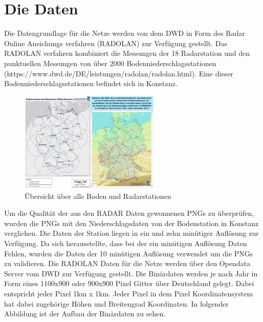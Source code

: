 \section{Die Daten}\label{die daten}
Die Datengrundlage für die Netze werden von dem DWD in Form des Radar Online Aneichungs verfahren (RADOLAN) zur Verfügung gestellt. Das RADOLAN verfahren kombiniert die Messungen der 18 Radarstation und den punktuellen Messungen von über 2000 Bodenniederschlagsstationen (https://www.dwd.de/DE/leistungen/radolan/radolan.html). Eine dieser Bodenniederschlagsstationen befindet sich in Konstanz. 

\begin{figure}[htb]
 \centering
 \includegraphics[width=0.6\textwidth,angle=0]{abb/daten_stationsuebersicht}
 \caption[Stationen Übersicht]{Übersicht über alle Boden und Radarstationen}
\label{fig:daten_stationsuebersicht}
\end{figure}

Um die Qualität der aus den RADAR Daten gewonnenen PNGs zu überprüfen, wurden die PNGs mit den Niederschlagsdaten von der Bodenstation in Konstanz verglichen. Die Daten der Station liegen in ein und zehn minütiger Auflösung zur Verfügung. Da sich herausstellte, dass bei der ein minütigen Auflösung Daten Fehlen, wurden die Daten der 10 minütigen Auflösung verwendet um die PNGs zu validieren. 
Die RADOLAN Daten für die Netze werden über den Opendata Server vom DWD zur Verfügung gestellt. Die Binärdaten werden je nach Jahr in Form eines 1100x900 oder 900x900 Pixel Gitter über Deutschland gelegt.  Dabei entspricht jeder Pixel 1km x 1km. Jeder Pixel in dem Pixel Koordinatensystem hat dabei zugehörige Höhen und Breitengrad Koordinaten. In folgender Abbildung ist der Aufbau der Binärdaten zu sehen.

